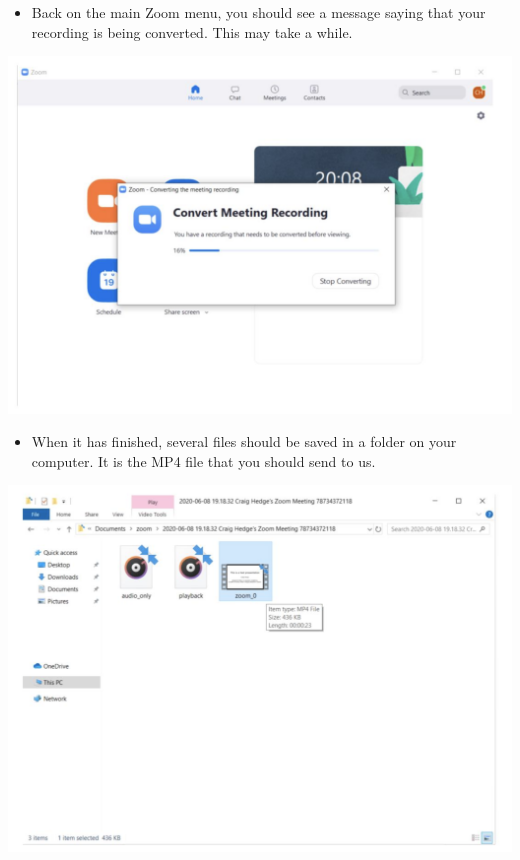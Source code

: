\documentclass[
  12pt,
]{book}
\providecommand{\tightlist}{%
  \setlength{\itemsep}{0pt}\setlength{\parskip}{0pt}}
\begin{document}
\begin{itemize}
\tightlist
\item
  Back on the main Zoom menu, you should see a message saying that your recording is being converted. This may take a while.
\end{itemize}

\includegraphics{zoom9.png}

\begin{itemize}
\tightlist
\item
  When it has finished, several files should be saved in a folder on your computer. It is the MP4 file that you should send to us.
\end{itemize}

\includegraphics{zoom10.png}
\end{document}
